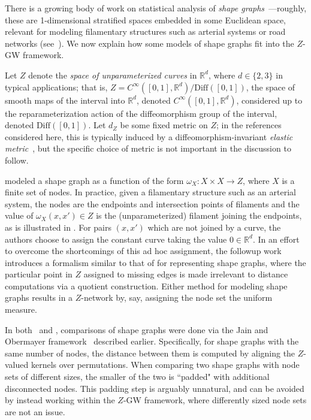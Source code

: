 \documentclass[twoside,11pt]{article}
\theoremstyle{definition}
\newcommand{\R}{\mathbb{R}}
\begin{document}
 There is a growing body of work on statistical analysis of \emph{shape graphs}~\citep{sukurdeep2022new,liang2023shape,guo2022statistical,srivastava2020advances,bal2024statistical}---roughly, these are 1-dimensional stratified spaces embedded in some Euclidean space, relevant for modeling filamentary structures such as arterial systems or road networks (see~). We now explain how some models of shape graphs fit into the $Z$-GW framework. 

 Let $Z$ denote the \emph{space of unparameterized curves} in $\R^d$, where $d \in \{2,3\}$ in typical applications; that is, $Z = C^\infty([0,1],\R^d)/\mathrm{Diff}([0,1])$, the space of smooth maps of the interval into $\R^d$, denoted $C^\infty([0,1],\R^d)$, considered up to the reparameterization action of the diffeomorphism group of the interval, denoted $\textrm{Diff}([0,1])$. Let $d_Z$ be some fixed metric on $Z$; in the references considered here, this is typically induced by a diffeomorphism-invariant \emph{elastic metric}~\citep{srivastava2016functional,bauer2024elastic}, but the specific choice of metric is not important in the discussion to follow. 


 \citet{guo2022statistical} modeled a shape graph as a function of the form  $\omega_X:X \times X \to Z$, where $X$ is a finite set of nodes. In practice, given a filamentary structure such as an arterial system, the nodes are the endpoints and intersection points of filaments and the value of $\omega_X(x,x') \in Z$ is the (unparameterized) filament joining the endpoints, as is illustrated in .  For pairs $(x,x')$ which are not joined by a curve, the authors choose to assign the constant curve taking the value $0 \in \R^d$. In an effort to overcome the shortcomings of this ad hoc assignment, the followup work~\citep{bal2024statistical} introduces a formalism similar to that of  for representing shape graphs, where the particular point in $Z$ assigned to missing edges is made irrelevant to distance computations via a quotient construction. Either method for modeling shape graphs results in a $Z$-network by, say, assigning the node set the uniform measure.

 In both~\citet{guo2022statistical} and \citet{bal2024statistical}, comparisons of shape graphs were done via the Jain and Obermayer framework~\citep{jain2009structure} described earlier. Specifically, for shape graphs with the same number of nodes, the distance between them is computed by aligning the $Z$-valued kernels over permutations. When comparing two shape graphs with node sets of different sizes, the smaller of the two is ``padded" with additional disconnected nodes. This padding step is arguably unnatural, and can be avoided by instead working within the $Z$-GW framework, where differently sized node sets are not an issue.
\end{document}
